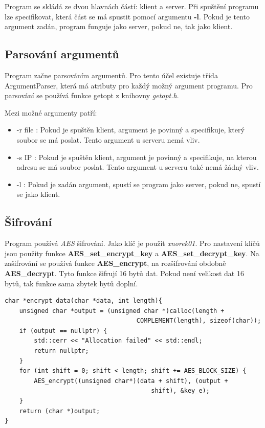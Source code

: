 \documentclass[11pt, a4paper]{article}
\begin{document}
Program se skládá ze dvou hlavnách částí: klient a server. Při spuštění programu lze specifikovat, která část se má spustit pomocí argumentu \textbf{-l}. Pokud je tento argument zadán, program funguje jako server, pokud ne, tak jako klient.

\subsection{Parsování argumentů}
Program začne parsováním argumentů. Pro tento účel existuje třída ArgumentParser, která má atributy pro každý možný argument programu. 
Pro parsování se používá funkce getopt z knihovny \emph{getopt.h}.

\begin{flushleft}
Mezi možné argumenty patří:
\end{flushleft}

 \begin{itemize}
      \item -r file : Pokud je spuštěn klient, argument je povinný a specifikuje, který soubor se má poslat. Tento argument u serveru nemá vliv.
      \item -s IP : Pokud je spuštěn klient, argument je povinný a specifikuje, na kterou adresu se má soubor poslat. Tento argument u serveru také nemá žádný vliv.
      \item -l : Pokud je zadán argument, spustí se program jako server, pokud ne, spustí se jako klient.

\end{itemize}

\subsection{Šifrování}
Program používá \emph{AES} šifrování. Jako klíč je použit \emph{xnorek01}. Pro nastavení klíčů jsou použity funkce \textbf{AES\_set\_encrypt\_key} a \textbf{AES\_set\_decrypt\_key}. Na zašifrování se používá funkce \textbf{AES\_encrypt}, na rozšifrování obdobně \textbf{AES\_decrypt}. Tyto funkce šifrují 16 bytů dat. Pokud není velikost dat 16 bytů, tak funkce sama zbytek bytů doplní. 


\begin{verbatim}
char *encrypt_data(char *data, int length){
    unsigned char *output = (unsigned char *)calloc(length + 
                                    COMPLEMENT(length), sizeof(char));
    if (output == nullptr) {
        std::cerr << "Allocation failed" << std::endl;
        return nullptr;
    }
    for (int shift = 0; shift < length; shift += AES_BLOCK_SIZE) {
        AES_encrypt((unsigned char*)(data + shift), (output + 
                                        shift), &key_e);
    }
    return (char *)output;
}
\end{verbatim}
\end{document}
